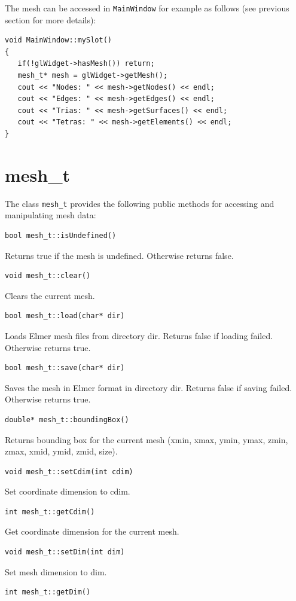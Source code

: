 The mesh can be accessed in {\tt MainWindow} for example as follows
(see previous section for more details):
\begin{verbatim}
void MainWindow::mySlot()
{
   if(!glWidget->hasMesh()) return;
   mesh_t* mesh = glWidget->getMesh();
   cout << "Nodes: " << mesh->getNodes() << endl;
   cout << "Edges: " << mesh->getEdges() << endl;
   cout << "Trias: " << mesh->getSurfaces() << endl;
   cout << "Tetras: " << mesh->getElements() << endl;
}
\end{verbatim}

\section{mesh\_t}

The class {\tt mesh\_t} provides the following public methods for accessing
and manipulating mesh data:
\begin{verbatim}
bool mesh_t::isUndefined()
\end{verbatim}
Returns true if the mesh is undefined. Otherwise returns false.
\begin{verbatim}
void mesh_t::clear()
\end{verbatim}
Clears the current mesh.
\begin{verbatim} 
bool mesh_t::load(char* dir)
\end{verbatim}
Loads Elmer mesh files from directory dir. Returns false if loading failed. Otherwise returns true.
\begin{verbatim} 
bool mesh_t::save(char* dir)
\end{verbatim}
Saves the mesh in Elmer format in directory dir. Returns false if saving failed. Otherwise returns true.
\begin{verbatim} 
double* mesh_t::boundingBox()
\end{verbatim}
Returns bounding box for the current mesh (xmin, xmax, ymin, ymax, zmin, zmax, xmid, ymid, zmid, size).
\begin{verbatim} 
void mesh_t::setCdim(int cdim)
\end{verbatim}
Set coordinate dimension to cdim.
\begin{verbatim}  
int mesh_t::getCdim()
\end{verbatim}
Get coordinate dimension for the current mesh.
\begin{verbatim}  
void mesh_t::setDim(int dim)
\end{verbatim}
Set mesh dimension to dim.
\begin{verbatim}
int mesh_t::getDim()
\end{verbatim}

